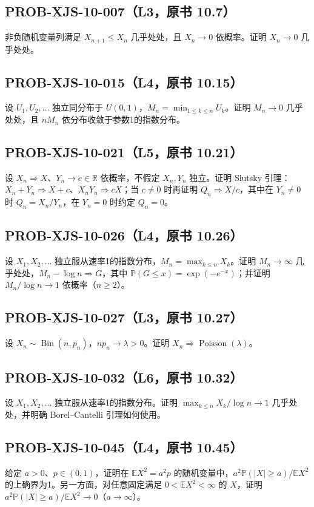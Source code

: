 \documentclass[UTF8]{ctexart}
\begin{document}
\subsection*{PROB-XJS-10-007（L3，原书 10.7）}
非负随机变量列满足 $X_{n+1}\le X_n$ 几乎处处，且 $X_n\to0$ 依概率。证明 $X_n\to0$ 几乎处处。

\subsection*{PROB-XJS-10-015（L4，原书 10.15）}
设 $U_1,U_2,\ldots$ 独立同分布于 $U(0,1)$，$M_n=\min_{1\le k\le n}U_k$。证明 $M_n\to0$ 几乎处处，且 $nM_n$ 依分布收敛于参数1的指数分布。

\subsection*{PROB-XJS-10-021（L5，原书 10.21）}
设 $X_n\Rightarrow X$、$Y_n\to c\in\mathbb R$ 依概率，不假定 $X_n,Y_n$ 独立。证明 Slutsky 引理：$X_n+Y_n\Rightarrow X+c$、$X_nY_n\Rightarrow cX$；当 $c\ne0$ 时再证明 $Q_n\Rightarrow X/c$，其中在 $Y_n\ne0$ 时 $Q_n=X_n/Y_n$，在 $Y_n=0$ 时约定 $Q_n=0$。

\subsection*{PROB-XJS-10-026（L4，原书 10.26）}
设 $X_1,X_2,\ldots$ 独立服从速率1的指数分布，$M_n=\max_{k\le n}X_k$。证明 $M_n\to\infty$ 几乎处处，$M_n-\log n\Rightarrow G$，其中 $\mathbb P(G\le x)=\exp(-e^{-x})$；并证明 $M_n/\log n\to1$ 依概率（$n\ge2$）。

\subsection*{PROB-XJS-10-027（L3，原书 10.27）}
设 $X_n\sim\operatorname{Bin}(n,p_n)$，$np_n\to\lambda>0$。证明 $X_n\Rightarrow\operatorname{Poisson}(\lambda)$。

\subsection*{PROB-XJS-10-032（L6，原书 10.32）}
设 $X_1,X_2,\ldots$ 独立服从速率1的指数分布。证明 $\max_{k\le n}X_k/\log n\to1$ 几乎处处，并明确 Borel–Cantelli 引理如何使用。

\subsection*{PROB-XJS-10-045（L4，原书 10.45）}
给定 $a>0$、$p\in(0,1)$，证明在 $\mathbb E X^2=a^2p$ 的随机变量中，$a^2\mathbb P(|X|\ge a)/\mathbb E X^2$ 的上确界为1。另一方面，对任意固定满足 $0<\mathbb E X^2<\infty$ 的 $X$，证明 $a^2\mathbb P(|X|\ge a)/\mathbb E X^2\to0$（$a\to\infty$）。
\end{document}
